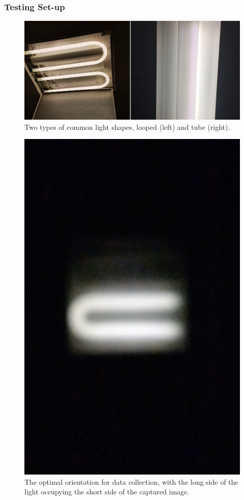 \documentclass[conference]{IEEEtran}
\begin{document}
\subsubsection{Testing Set-up}\label{section:testingsetup}

\begin{figure}
\centerline{\includegraphics[width=0.9\columnwidth]{figures/comparison.jpg}}
	\caption{Two types of common light shapes, looped (left) and tube (right).}
	\label{fig:lighttypes}
\end{figure}

\begin{figure}
\centerline{\includegraphics[width=0.5\columnwidth]{figures/looped.jpg}}
	\caption{The optimal orientation for data collection, with the long side of the light occupying the short side of the captured image.}
	\label{fig:loopedlight}
\end{figure}
\end{document}
